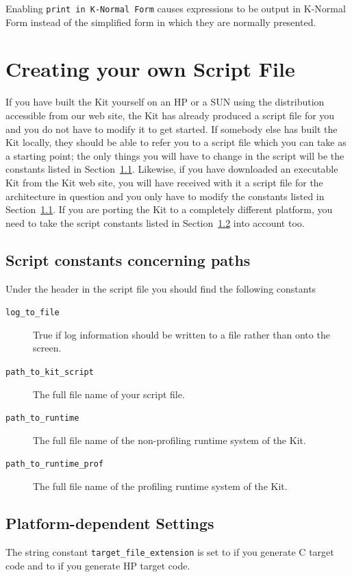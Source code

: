 \documentclass[12pt]{book}
\begin{document}
Enabling \texttt{print in K-Normal Form} causes  expressions to be output
in K-Normal Form instead of the simplified form in which they are
normally presented.
%
\section{Creating your own Script File}
\label{scriptmodify.sec}
%
If you have built the Kit yourself on an HP or a SUN using
the distribution accessible from our web site, the Kit has
already produced a script file for you and you do not have
to modify it to get started. If somebody else has built
the Kit locally, they should be able to refer you to a script file which you
can take as a starting point; the only things you will
have to change in the script will be the constants
listed in Section~\ref{paths.sec}. Likewise, if
you have downloaded an executable Kit from the Kit web site,
you will have received with it a script file for the architecture
in question and you only have to modify the constants listed
in Section~\ref{paths.sec}.
If you are porting the Kit to a completely 
different platform, you need to take the script constants 
listed in Section~\ref{cflags.sec} into account too.
\subsection{Script constants concerning paths}
\label{paths.sec}
Under the header  in the script file you should
find the following constants
\begin{description}
\item[{\tt log\_to\_file}] True if log information should be written
to a file rather than onto the screen.
\item[{\tt path\_to\_kit\_script}] The full file name of 
your script file.
\item[{\tt path\_to\_runtime}] The full file name of the non-profiling
runtime system of the Kit.
\item[{\tt path\_to\_runtime\_prof}] The full file name of the profiling
runtime system of the Kit.
\end{description}
\subsection{Platform-dependent Settings}
\label{cflags.sec}
The string constant {\tt target\_file\_extension} is set to
 if you generate C target code and to 
if you generate HP target code.
\end{document}
